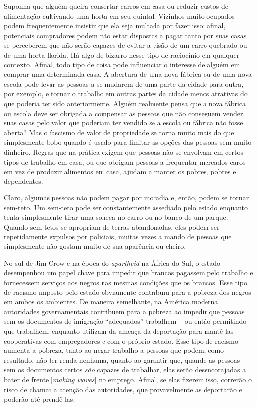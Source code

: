 Suponha que alguém queira consertar carros em casa ou reduzir custos de alimentação cultivando uma horta em seu quintal. Vizinhos muito ocupados podem frequentemente insistir que ela seja multada por fazer isso: afinal, potenciais compradores podem não estar dispostos a pagar tanto por suas casas se perceberem que não serão capazes de evitar a visão de um carro quebrado ou de uma horta florida. Há algo de bizarro nesse tipo de raciocínio em qualquer contexto. Afinal, todo tipo de coisa pode influenciar o interesse de alguém em comprar uma determinada casa. A abertura de uma nova fábrica ou de uma nova escola pode levar as pessoas a se mudarem de uma parte da cidade para outra, por exemplo, e tornar o trabalho em outras partes da cidade menos atrativas do que poderia ter sido anteriormente. Alguém realmente pensa que a nova fábrica ou escola deve ser obrigada a compensar as pessoas que não conseguem vender suas casas pelo valor que poderiam ter vendido se a escola ou fábrica não fosse aberta? Mas o fascismo de valor de propriedade se torna muito mais do que simplesmente bobo quando é usado para limitar as opções das pessoas sem muito dinheiro. Regras que na prática exigem que pessoas não se envolvam em certos tipos de trabalho em casa, ou que obrigam pessoas a frequentar mercados caros em vez de produzir alimentos em casa, ajudam a manter os pobres, pobres e dependentes.

Claro, algumas pessoas não podem pagar por moradia e, então, podem se tornar sem-teto. Um sem-teto pode ser constantemente assediado pelo estado enquanto tenta simplesmente tirar uma soneca no carro ou no banco de um parque. Quando sem-tetos se apropriam de terras abandonadas, eles podem ser repetidamente expulsos por policiais, muitas vezes a mando de pessoas que simplesmente não gostam muito de sua aparência ou cheiro.

No sul de Jim Crow e na época do \emph{apartheid} na África do Sul, o estado desempenhou um papel chave para impedir que brancos pagassem pelo trabalho e fornecessem serviços aos negros nas mesmas condições que os brancos. Esse tipo de racismo imposto pelo estado obviamente contribuiu para a pobreza dos negros em ambos os ambientes. De maneira semelhante, na América moderna autoridades governamentais contribuem para a pobreza ao impedir que pessoas sem os documentos de imigração ``adequados'' trabalhem -- ou então permitindo que trabalhem, enquanto utilizam da ameaça da deportação para mantê-las cooperativas com empregadores e com o próprio estado. Esse tipo de racismo aumenta a pobreza, tanto ao negar trabalho a pessoas que podem, como resultado, não ter renda nenhuma, quanto ao garantir que, quando as pessoas sem os documentos certos \emph{são} capazes de trabalhar, elas serão desencorajadas a bater de frente [\emph{making waves}] no emprego. Afinal, se elas fizerem isso, correrão o risco de chamar a atenção das autoridades, que provavelmente as deportarão e poderão até prendê-las. 

